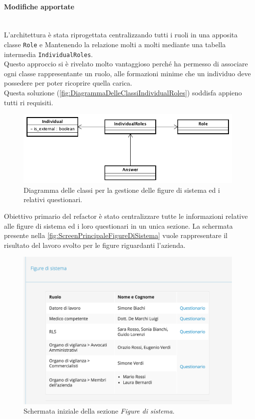 	\paragraph*{Modifiche apportate}\mbox{} \\
	L'architettura è stata riprogettata centralizzando tutti i ruoli in una apposita classe \texttt{Role} e Mantenendo la relazione molti a molti mediante una tabella intermedia \texttt{IndividualRoles}. \\
	Questo approccio si è rivelato molto vantaggioso perché ha permesso di associare ogni classe rappresentante un ruolo, alle formazioni minime che un individuo deve possedere per poter ricoprire quella carica. \\
	Questa soluzione (\autoref{fig:DiagrammaDelleClassiIndividualRoles}) soddisfa appieno tutti ri requisiti.\\
		\begin{figure}[H]
			\begin{center}
				\includegraphics[width=12cm]{Pics/UMLClassiFigureDiSistema.png}
				\caption{
					Diagramma delle classi per la gestione delle figure di sistema ed i relativi questionari.}
				\label{fig:DiagrammaDelleClassiIndividualRoles}
			\end{center}
		\end{figure}
	Obiettivo primario del refactor è stato centralizzare tutte le informazioni relative alle figure di sistema ed i loro questionari in un unica sezione. 
	La schermata presente nella  \autoref{fig:ScreenPrincipaleFigureDiSistema} vuole rappresentare il risultato del lavoro svolto per le figure riguardanti l'azienda. \\
		\begin{figure}[H]
			\begin{center}
				\includegraphics[width=12cm]{Pics/ScreenFigureDiSistemaProspetto.png}
				\caption{
					Schermata iniziale della sezione \textit{Figure di sistema}.}
				\label{fig:ScreenPrincipaleFigureDiSistema}
			\end{center}
		\end{figure}
